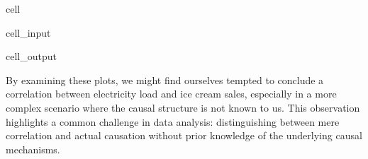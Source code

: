 \documentclass[letterpaper,10pt,english]{jupyterBook}
\begin{document}
\begin{sphinxuseclass}{cell}
\begin{sphinxVerbatimInput}
\begin{sphinxuseclass}{cell_input}
\begin{sphinxVerbatim}[commandchars=\\\{\}]
  \PYG{p}{[}\PYG{p}{]}\PYG{p}{[}\PYG{p}{]} \PYG{p}{[}\PYG{p}{]}   
\PYG{p}{[}\PYG{p}{]}
\PYG{p}{[}\PYG{p}{]}
\PYG{p}{[}\PYG{p}{]}

\end{sphinxVerbatim}

\end{sphinxuseclass}\end{sphinxVerbatimInput}
\begin{sphinxVerbatimOutput}

\begin{sphinxuseclass}{cell_output}
\noindent{}

\end{sphinxuseclass}\end{sphinxVerbatimOutput}

\end{sphinxuseclass}
\sphinxAtStartPar
By examining these plots, we might find ourselves tempted to conclude a correlation between electricity load and ice cream sales, especially in a more complex scenario where the causal structure is not known to us. This observation highlights a common challenge in data analysis: distinguishing between mere correlation and actual causation without prior knowledge of the underlying causal mechanisms.

\sphinxstepscope
\end{document}
